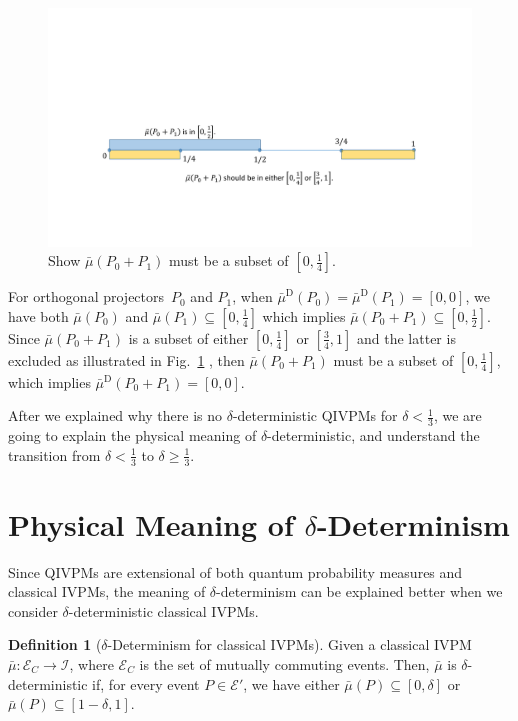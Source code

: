 \documentclass[english,reprint, aps, prl,superscriptaddress, showpacs,
showkeys, longbibliography, amsmath, amssymb, floatfix]{revtex4-1}
\theoremstyle{plain}
\theoremstyle{definition}
\newtheorem{definition}{Definition}
\newcommand{\events}{\ensuremath{\mathcal{E}}}
\newcommand{\imposs}{\ensuremath{\left[0,0\right]}}
\newcommand{\eventsC}{\ensuremath{\events_{C}}}
\begin{document}
\begin{figure}
\includegraphics[bb=50bp 100bp 900bp 300bp,clip,scale=0.5]{prop_prop_letter_ajhs_referee_response_pptx}\caption{\label{fig:Show-subset}Show $\bar{\mu}\left(P_{0}+P_{1}\right)$
must be a subset of $\left[0,\frac{1}{4}\right]$.}
\end{figure}
For orthogonal projectors~$P_{0}$ and $P_{1}$, when $\bar{\mu}^{\textrm{D}}\left(P_{0}\right)=\bar{\mu}^{\textrm{D}}\left(P_{1}\right)=\imposs$,
we have both $\bar{\mu}\left(P_{0}\right)$ and $\bar{\mu}\left(P_{1}\right)\subseteq\left[0,\frac{1}{4}\right]$
which implies $\bar{\mu}\left(P_{0}+P_{1}\right)\subseteq\left[0,\frac{1}{2}\right]$.
Since $\bar{\mu}\left(P_{0}+P_{1}\right)$ is a subset of either $\left[0,\frac{1}{4}\right]$
or $\left[\tfrac{3}{4},1\right]$ and the latter is excluded as illustrated
in Fig.~\ref{fig:Show-subset} , then $\bar{\mu}\left(P_{0}+P_{1}\right)$
must be a subset of $\left[0,\frac{1}{4}\right]$, which implies $\bar{\mu}^{\textrm{D}}\left(P_{0}+P_{1}\right)=\imposs$.

After we explained why there is no $\delta$-deterministic QIVPMs
for $\delta<\frac{1}{3}$, we are going to explain the physical meaning
of $\delta$-deterministic, and understand the transition from $\delta<\frac{1}{3}$
to $\delta\ge\frac{1}{3}$.

\section{Physical Meaning of $\delta$-Determinism}

Since QIVPMs are extensional of both quantum probability measures
and classical IVPMs, the meaning of $\delta$-determinism can be explained
better when we consider $\delta$-deterministic classical IVPMs.

\begin{definition}[$\delta$-Determinism for classical IVPMs]\label{def:delta-deterministic-classical}
Given a classical IVPM~$\bar{\mu}:\eventsC\rightarrow\mathscr{I}$,
where $\eventsC$ is the set of mutually commuting events. Then, $\bar{\mu}$
is $\delta$-deterministic if, for every event $P\in\events'$, we
have either $\bar{\mu}\left(P\right)\subseteq\left[0,\delta\right]$
or $\bar{\mu}\left(P\right)\subseteq\left[1-\delta,1\right]$. \end{definition}
\end{document}
